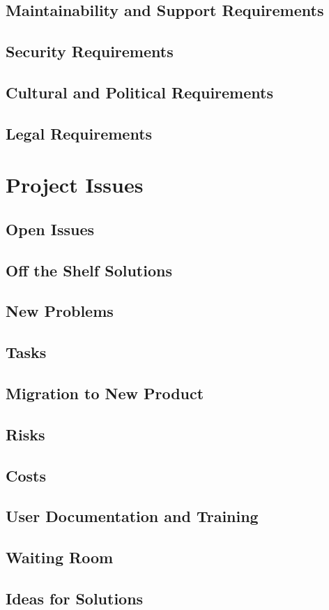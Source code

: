 \documentclass[12pt]{article}
\begin{document}
\subsection{Maintainability and Support Requirements}
\subsection{Security Requirements}
\subsection{Cultural and Political Requirements}
\subsection{Legal Requirements}

\section{Project Issues}
\subsection{Open Issues}
\subsection{Off the Shelf Solutions}
\subsection{New Problems}
\subsection{Tasks}
\subsection{Migration to New Product}
\subsection{Risks}
\subsection{Costs}
\subsection{User Documentation and Training}
\subsection{Waiting Room}
\subsection{Ideas for Solutions}
\end{document}
